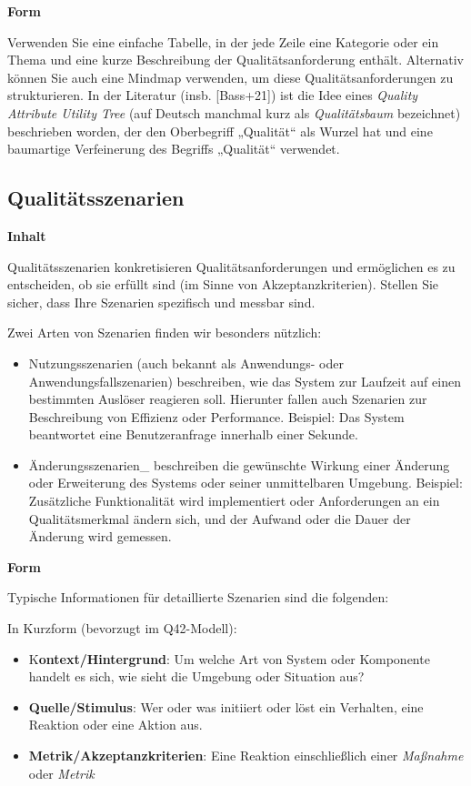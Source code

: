 \documentclass[a4paper,12pt]{article}
\begin{document}
\textbf{Form}

Verwenden Sie eine einfache Tabelle, in der jede Zeile eine Kategorie
oder ein Thema und eine kurze Beschreibung der Qualitätsanforderung
enthält. Alternativ können Sie auch eine Mindmap verwenden, um diese
Qualitätsanforderungen zu strukturieren. In der Literatur (insb.
{[}Bass+21{]}) ist die Idee eines \emph{Quality Attribute Utility Tree}
(auf Deutsch manchmal kurz als \emph{Qualitätsbaum} bezeichnet)
beschrieben worden, der den Oberbegriff „Qualität`` als Wurzel hat und
eine baumartige Verfeinerung des Begriffs „Qualität`` verwendet.

\subsection{Qualitätsszenarien}\label{_qualituxe4tsszenarien}

\textbf{Inhalt}

Qualitätsszenarien konkretisieren Qualitätsanforderungen und ermöglichen
es zu entscheiden, ob sie erfüllt sind (im Sinne von
Akzeptanzkriterien). Stellen Sie sicher, dass Ihre Szenarien spezifisch
und messbar sind.

Zwei Arten von Szenarien finden wir besonders nützlich:

\begin{itemize}
\item
  Nutzungsszenarien (auch bekannt als Anwendungs- oder
  Anwendungsfallszenarien) beschreiben, wie das System zur Laufzeit auf
  einen bestimmten Auslöser reagieren soll. Hierunter fallen auch
  Szenarien zur Beschreibung von Effizienz oder Performance. Beispiel:
  Das System beantwortet eine Benutzeranfrage innerhalb einer Sekunde.
\item
  Änderungsszenarien\_ beschreiben die gewünschte Wirkung einer Änderung
  oder Erweiterung des Systems oder seiner unmittelbaren Umgebung.
  Beispiel: Zusätzliche Funktionalität wird implementiert oder
  Anforderungen an ein Qualitätsmerkmal ändern sich, und der Aufwand
  oder die Dauer der Änderung wird gemessen.
\end{itemize}

\textbf{Form}

Typische Informationen für detaillierte Szenarien sind die folgenden:

In Kurzform (bevorzugt im Q42-Modell):

\begin{itemize}
\item
  K\textbf{ontext/Hintergrund}: Um welche Art von System oder Komponente
  handelt es sich, wie sieht die Umgebung oder Situation aus?
\item
  \textbf{Quelle/Stimulus}: Wer oder was initiiert oder löst ein
  Verhalten, eine Reaktion oder eine Aktion aus.
\item
  \textbf{Metrik/Akzeptanzkriterien}: Eine Reaktion einschließlich einer
  \emph{Maßnahme} oder \emph{Metrik}
\end{itemize}
\end{document}
